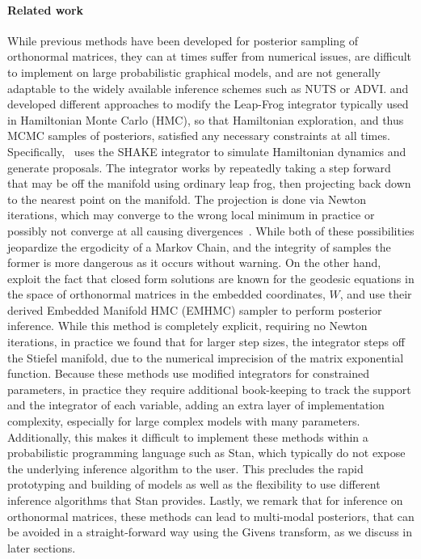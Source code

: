 \documentclass{article}
\begin{document}
\paragraph{Related work} While previous methods have been developed for posterior sampling of orthonormal matrices, they can at times suffer from numerical issues, are difficult to implement on large probabilistic graphical models, and are not generally adaptable to the widely available inference schemes such as NUTS or ADVI. \citet{brubaker2012family} and \citet{byrne2013geodesic} developed different approaches to modify the Leap-Frog integrator typically used in Hamiltonian Monte Carlo (HMC), so that Hamiltonian exploration, and thus MCMC samples of posteriors, satisfied any necessary constraints at all times. Specifically,~\citet{brubaker2012family} uses the SHAKE integrator \citep{leimkuhler2004simulating} to simulate Hamiltonian dynamics and generate proposals. The integrator works by repeatedly taking a step forward that may be off the manifold using ordinary leap frog, then projecting back down to the nearest point on the manifold. The projection is done via Newton iterations, which may converge to the wrong local minimum in practice or possibly not converge at all causing divergences~\citep{betancourt2017divergences}. While both of these possibilities jeopardize the ergodicity of a Markov Chain, and the integrity of samples the former is more dangerous as it occurs without warning. On the other hand, \citet{byrne2013geodesic}~ exploit the fact that closed form solutions are known for the geodesic equations in the space of orthonormal matrices in the embedded coordinates, $W$, and use their derived Embedded Manifold HMC (EMHMC) sampler to perform posterior inference. While this method is completely explicit, requiring no Newton iterations, in practice we found that for larger step sizes, the integrator steps off the Stiefel manifold, due to the numerical imprecision of the matrix exponential function. Because these methods use modified integrators for constrained parameters, in practice they require additional book-keeping to track the support and the integrator of each variable, adding an extra layer of implementation complexity, especially for large complex models with many parameters.  Additionally, this makes it difficult to implement these methods within a probabilistic programming language such as Stan, which typically do not expose the underlying inference algorithm to the user. This precludes the rapid prototyping and building of models as well as the flexibility to use different inference algorithms that Stan provides. Lastly, we remark that for inference on orthonormal matrices, these methods can lead to multi-modal posteriors, that can be avoided in a straight-forward way using the Givens transform, as we discuss in later sections.
\end{document}

